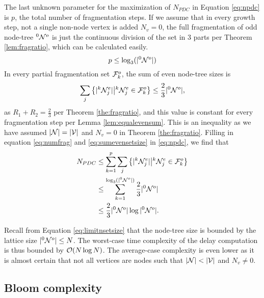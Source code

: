 % 

The last unknown parameter for the maximization of $N_{PDC}$ in Equation \eqref{eq:npdc} is $p$, the total number of fragmentation steps. If we assume that in every growth step, not a single non-node vertex is added $N_v = 0$, the full fragmentation of odd node-tree ${}^{0}\mathcal{N}^o$ is just the continuous division of the set in 3 parts per Theorem \ref{lem:fragratio}, which can be calculated easily.
\begin{equation}\label{eq:numfrag}
  p \leq \log_3(\abs{\pre{0}\nset^o})
\end{equation}
In every partial fragmentation set $\mathcal{F}^o_k$, the sum of even node-tree sizes is
\begin{equation}\label{eq:sumevensetsize}
  \sum_j \left\{ \abs{\pre{k}\nset_j^e} \big| \pre{k}\nset_j^e \in \m{F}^o_k \right\} \leq \frac{2}{3}\abs{\pre{0}\nset^o},
\end{equation}
as $R_1+R_2 = \frac{2}{3}$ per Theorem \ref{the:fragratio}, and this value is constant for every fragmentation step per Lemma \ref{lem:equalevensum}. This is an inequality as we have assumed $|\mathcal{N}| = |\mathcal{V}|$ and $N_v=0$ in Theorem \ref{the:fragratio}. Filling in equation \eqref{eq:numfrag} and \eqref{eq:sumevensetsize} in \eqref{eq:npdc}, we find that
\begin{align}
  \nonumber N_{PDC} & \leq \sum_{k=1}^{p} \sum_j \left\{ \lvert{}^{k}\mathcal{N}_j^e\rvert \big| {}^{k}\mathcal{N}_j^e \in \mathcal{F}^o_k \right\} \\
  \nonumber         & \leq \sum_{k=1}^{\log_3(\lvert{}^{0}\mathcal{N}^o\rvert)} \frac{2}{3}\lvert{}^{0}\mathcal{N}^o\rvert                          \\
                    & \leq \frac{2}{3}\lvert{}^{0}\mathcal{N}^o\rvert\log{\lvert {}^{0} \mathcal{N}^o\rvert}.
\end{align}

Recall from Equation \eqref{eq:limitnsetsize} that the node-tree size is bounded by the lattice size $|{}^{0}\mathcal{N}^o| \leq N$. The worst-case time complexity of the delay computation is thus bounded by $\mathcal{O}(N\log{N})$. The average-case complexity is even lower as it is almost certain that not all vertices are nodes such that $|\mathcal{N}| < |\mathcal{V}|$ and $N_v \neq 0$.

\subsection{Bloom complexity}\label{sec:bloomcomplexity}

